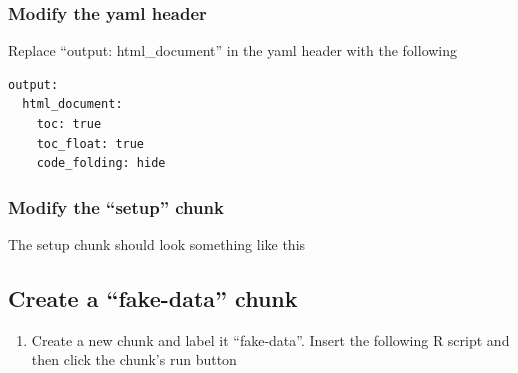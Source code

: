 \documentclass[]{book}
\newenvironment{Shaded}{\begin{snugshade}}{\end{snugshade}}
\newcommand{\CommentTok}[1]{\textcolor[rgb]{0.56,0.35,0.01}{\textit{#1}}}
\newcommand{\DataTypeTok}[1]{\textcolor[rgb]{0.13,0.29,0.53}{#1}}
\newcommand{\KeywordTok}[1]{\textcolor[rgb]{0.13,0.29,0.53}{\textbf{#1}}}
\newcommand{\NormalTok}[1]{#1}
\newcommand{\OperatorTok}[1]{\textcolor[rgb]{0.81,0.36,0.00}{\textbf{#1}}}
\newcommand{\OtherTok}[1]{\textcolor[rgb]{0.56,0.35,0.01}{#1}}
\newcommand{\StringTok}[1]{\textcolor[rgb]{0.31,0.60,0.02}{#1}}
\providecommand{\tightlist}{%
  \setlength{\itemsep}{0pt}\setlength{\parskip}{0pt}}
\begin{document}
\hypertarget{modify-the-yaml-header}{%
\subsubsection{Modify the yaml header}\label{modify-the-yaml-header}}

Replace ``output: html\_document'' in the yaml header with the following

\begin{verbatim}
output:
  html_document:
    toc: true
    toc_float: true
    code_folding: hide
\end{verbatim}

\hypertarget{modify-the-setup-chunk}{%
\subsubsection{Modify the ``setup'' chunk}\label{modify-the-setup-chunk}}

The setup chunk should look something like this

\begin{Shaded}
\end{Shaded}

\hypertarget{create-a-fake-data-chunk}{%
\subsection{Create a ``fake-data'' chunk}\label{create-a-fake-data-chunk}}

\begin{enumerate}
\def\labelenumi{\arabic{enumi}.}
\setcounter{enumi}{3}
\tightlist
\item
  Create a new chunk and label it ``fake-data''. Insert the following R script and then click the chunk's run button
\end{enumerate}
\end{document}
